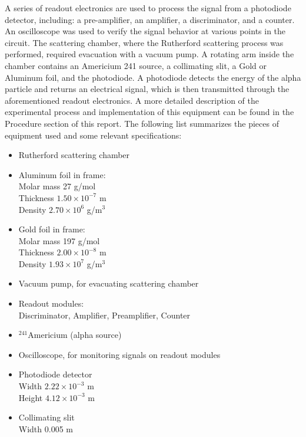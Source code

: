 \documentclass[a4paper]{article}
\begin{document}
\qq A series of readout electronics are used to process the signal from a photodiode detector, including: a pre-amplifier, an amplifier, a discriminator, and a counter. An oscilloscope was used to verify the signal behavior at various points in the circuit. The scattering chamber, where the Rutherford scattering process was performed, required evacuation with a vacuum pump. A rotating arm inside the chamber contains an Americium 241 source, a collimating slit, a Gold or Aluminum foil, and the photodiode. A photodiode detects the energy of the alpha particle and returns an electrical signal, which is then transmitted
through the aforementioned readout electronics. A more detailed description of the experimental process and implementation of this equipment can be found in the Procedure section of this report. The following list summarizes the pieces of equipment used and some relevant specifications:

\begin{itemize}
\item Rutherford scattering chamber 
\item Aluminum foil in frame:  \\
      Molar mass 27 g/mol \\
      Thickness $1.50 \times 10^{-7}$ m \\
      Density $2.70 \times 10^6$ g/m$^3$ 
\item Gold foil in frame: \\
      Molar mass 197 g/mol \\
      Thickness $2.00 \times 10^{-8}$ m \\
      Density $1.93 \times 10^7$ g/m$^3$ 
\item Vacuum pump, for evacuating scattering chamber
\item Readout modules: \\
      Discriminator, Amplifier, Preamplifier, Counter
\item $ ^{241}$Americium (alpha source)
\item Oscilloscope, for monitoring signals on readout modules
\item Photodiode detector \\
	  Width $2.22 \times 10^{-3}$ m \\
	  Height $4.12 \times 10^{-3}$ m 
\item Collimating slit \\
      Width 0.005 m 
\end{itemize}
\end{document}
